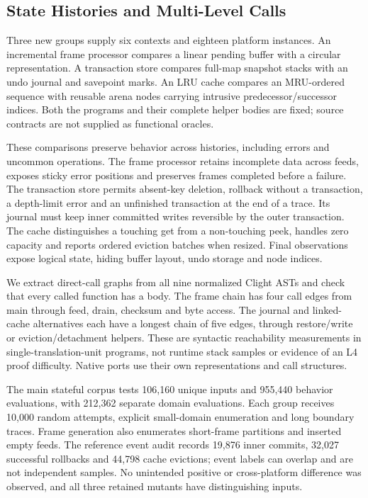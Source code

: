 \documentclass{article}
\begin{document}
\subsection{State Histories and Multi-Level Calls}
\label{sec:stateful}

Three new groups supply six contexts and eighteen platform instances. An incremental frame processor compares a linear pending buffer with a circular representation. A transaction store compares full-map snapshot stacks with an undo journal and savepoint marks. An LRU cache compares an MRU-ordered sequence with reusable arena nodes carrying intrusive predecessor/successor indices. Both the programs and their complete helper bodies are fixed; source contracts are not supplied as functional oracles.

These comparisons preserve behavior across histories, including errors and uncommon operations. The frame processor retains incomplete data across feeds, exposes sticky error positions and preserves frames completed before a failure. The transaction store permits absent-key deletion, rollback without a transaction, a depth-limit error and an unfinished transaction at the end of a trace. Its journal must keep inner committed writes reversible by the outer transaction. The cache distinguishes a touching get from a non-touching peek, handles zero capacity and reports ordered eviction batches when resized. Final observations expose logical state, hiding buffer layout, undo storage and node indices.

We extract direct-call graphs from all nine normalized Clight ASTs and check that every called function has a body. The frame chain has four call edges from main through feed, drain, checksum and byte access. The journal and linked-cache alternatives each have a longest chain of five edges, through restore/write or eviction/detachment helpers. These are syntactic reachability measurements in single-translation-unit programs, not runtime stack samples or evidence of an L4 proof difficulty. Native ports use their own representations and call structures.

The main stateful corpus tests 106,160 unique inputs and 955,440 behavior evaluations, with 212,362 separate domain evaluations. Each group receives 10,000 random attempts, explicit small-domain enumeration and long boundary traces. Frame generation also enumerates short-frame partitions and inserted empty feeds. The reference event audit records 19,876 inner commits, 32,027 successful rollbacks and 44,798 cache evictions; event labels can overlap and are not independent samples. No unintended positive or cross-platform difference was observed, and all three retained mutants have distinguishing inputs.
\end{document}
